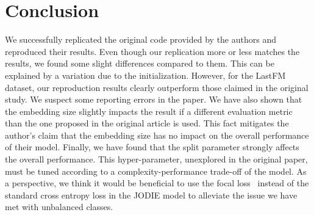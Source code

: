 \section{Conclusion}
We successfully replicated the original code provided by the authors and reproduced their results. Even though our replication more or less matches the results, we found some slight differences compared to them. This can be explained by a variation due to the initialization. However, for the LastFM dataset, our reproduction results clearly outperform those claimed in the original study. We suspect some reporting errors in the paper. We have also shown that the embedding size slightly impacts the result if a different evaluation metric than the one proposed in the original article is used. This fact mitigates the author's claim that the embedding size has no impact on the overall performance of their model. Finally, we have found that the split parameter strongly affects the overall performance. This hyper-parameter, unexplored in the original paper, must be tuned according to a complexity-performance trade-off of the model. As a perspective, we think it would be beneficial to use the focal loss~\cite{https://doi.org/10.48550/arxiv.1708.02002} instead of the standard cross entropy loss in the JODIE model to alleviate the issue we have met with unbalanced classes.